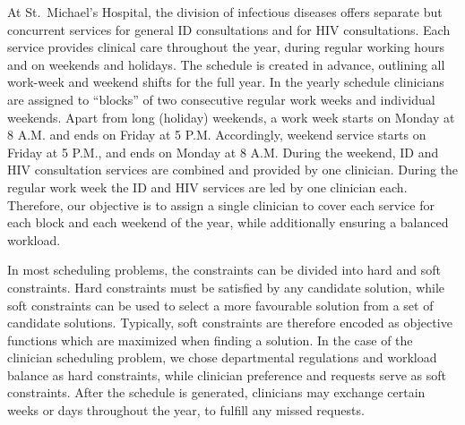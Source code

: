 At St.\ Michael's Hospital, the division of infectious diseases offers
separate but concurrent services for general ID consultations and for HIV consultations. Each
service provides clinical care throughout the year, during regular working hours
and on weekends and holidays. The schedule is created in advance,
outlining all work-week and weekend shifts for the full year.
In the yearly schedule clinicians are assigned to ``blocks'' of
two consecutive regular work weeks and individual weekends. Apart
from long (holiday) weekends, a work week starts on Monday at 8 A.M. and ends on
Friday at 5 P.M. Accordingly, weekend service starts on Friday at 5 P.M., and
ends on Monday at 8 A.M. During the weekend, ID and HIV consultation services
are combined and provided by one clinician. During the regular work week the ID
and HIV services are led by one clinician each.
Therefore, our objective is to assign a single clinician to cover
each service for each block and each weekend of the year, while 
additionally ensuring a balanced workload.

In most scheduling problems, the constraints can be divided into hard and soft
constraints. Hard constraints must be satisfied by any candidate solution, while
soft constraints can be used to select a more favourable solution from a set of
candidate solutions. Typically, soft constraints are therefore encoded as objective
functions which are
maximized when finding a solution. In the case of the clinician
scheduling problem, we chose departmental regulations and workload balance as hard constraints,
while clinician preference and requests serve as soft constraints.
After the schedule is generated, clinicians may
exchange certain weeks or days throughout the year, to fulfill any missed requests.

